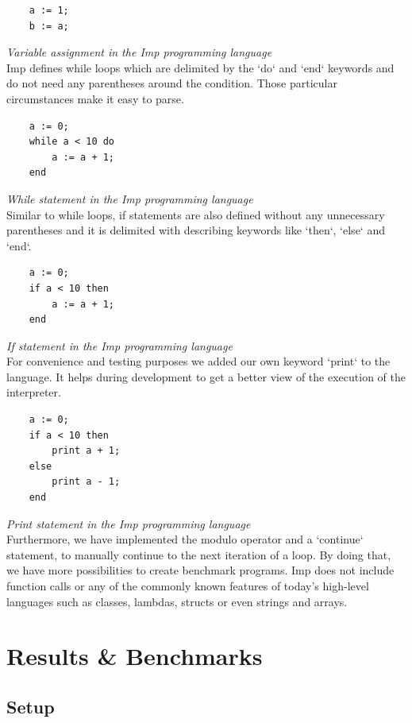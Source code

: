 \documentclass{article}
\begin{document}
\begin{verbatim}
    a := 1;
    b := a;
\end{verbatim}
\textit{Variable assignment in the Imp programming language} \\

Imp defines while loops which are delimited by the `do` and `end` keywords and
do not need any parentheses around the condition. Those particular circumstances
make it easy to parse.

\begin{verbatim}
    a := 0;
    while a < 10 do
        a := a + 1;
    end
\end{verbatim}
\textit{While statement in the Imp programming language} \\

Similar to while loops, if statements are also defined without any unnecessary
parentheses and it is delimited with describing keywords like `then`, `else`
and `end`.

\begin{verbatim}
    a := 0;
    if a < 10 then
        a := a + 1;
    end
\end{verbatim}
\textit{If statement in the Imp programming language} \\

For convenience and testing purposes we added our own keyword `print` to the
language. It helps during development to get a better view of the execution
of the interpreter.

\begin{verbatim}
    a := 0;
    if a < 10 then
        print a + 1;
    else
        print a - 1;
    end
\end{verbatim}
\textit{Print statement in the Imp programming language} \\

Furthermore, we have implemented the modulo operator and a `continue`
statement, to manually continue to the next iteration of a loop. By doing that,
we have more possibilities to create benchmark programs. Imp does not include
function calls or any of the commonly known features of today's high-level
languages such as classes, lambdas, structs or even strings and arrays.

\section{Results \& Benchmarks}
\subsection{Setup}
\end{document}
